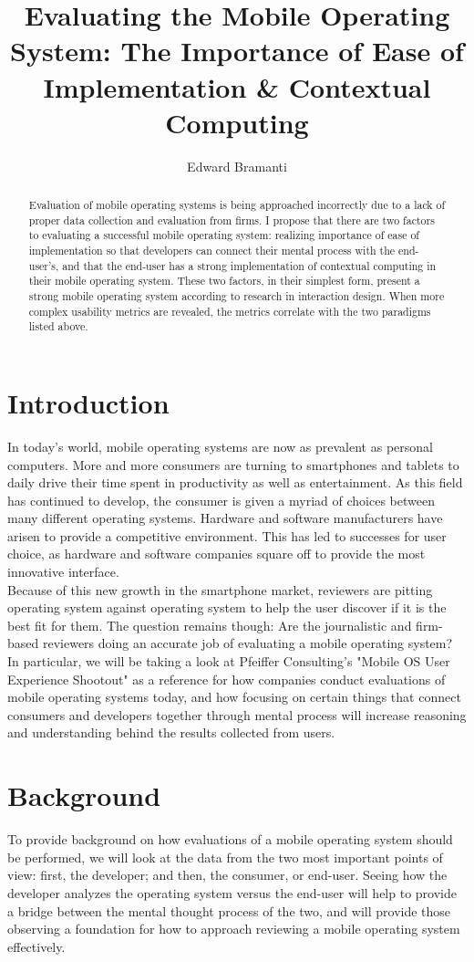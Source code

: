 \documentclass[11pt]{article}
\title{Evaluating the Mobile Operating System: The Importance of Ease of Implementation \& Contextual Computing}
\author{Edward Bramanti}
\begin{document}
\maketitle
\begin{abstract}
Evaluation of mobile operating systems is being approached incorrectly due to a lack of proper data collection and evaluation from firms. I propose that there are two factors to evaluating a successful mobile operating system: realizing importance of ease of implementation so that developers can connect their mental process with the end-user's, and that the end-user has a strong implementation of contextual computing in their mobile operating system. These two factors, in their simplest form, present a strong mobile operating system according to research in interaction design. When more complex usability metrics are revealed, the metrics correlate with the two paradigms listed above.
\end{abstract}
\pagebreak
\section{Introduction}
In today's world, mobile operating systems are now as prevalent as personal computers. More and more consumers are turning to smartphones and tablets to daily drive their time spent in productivity as well as entertainment. As this field has continued to develop, the consumer is given a myriad of choices between many different operating systems. Hardware and software manufacturers have arisen to provide a competitive environment. This has led to successes for user choice, as hardware and software companies square off to provide the most innovative interface.\\
\indent Because of this new growth in the smartphone market, reviewers are pitting operating system against operating system to help the user discover if it is the best fit for them. The question remains though: Are the journalistic and firm-based reviewers doing an accurate job of evaluating a mobile operating system? In particular, we will be taking a look at Pfeiffer Consulting's "Mobile OS User Experience Shootout" as a reference for how companies conduct evaluations of mobile operating systems today, and how focusing on certain things that connect consumers and developers together through mental process will increase reasoning and understanding behind the results collected from users.

\section{Background}
\label{background}
To provide background on how evaluations of a mobile operating system should be performed, we will look at the data from the two most important points of view: first, the developer; and then, the consumer, or end-user. Seeing how the developer analyzes the operating system versus the end-user will help to provide a bridge between the mental thought process of the two, and will provide those observing a foundation for how to approach reviewing a mobile operating system effectively.
\end{document}
